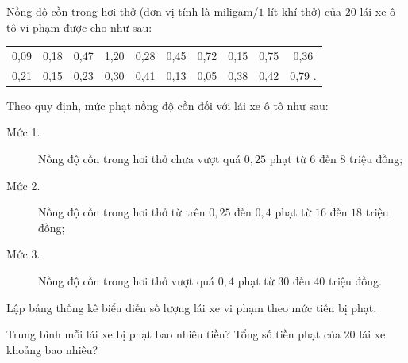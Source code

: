 \begin{ex}%
	Nồng độ cồn trong hơi thở (đơn vị tính là miligam/$1$ lít khí thở) của $20$ lái xe  ô tô vi phạm được cho như sau:
	\begin{center}
		\begin{tabular}{*{10}{c}}
			 0{,}09&0{,}18&0{,}47&1{,}20&0{,}28&0{,}45&0{,}72&0{,}15&0{,}75&0{,}36 \\
			 0{,}21&0{,}15&0{,}23&0{,}30&0{,}41&0{,}13&0{,}05&0{,}38&0{,}42&0{,}79 . \\
		\end{tabular}
	\end{center}
	 Theo quy định, mức phạt nồng độ cồn đối với lái xe ô tô như sau:
	\begin{description}
		\item[Mức  1.] Nồng độ cồn trong hơi thở chưa vượt quá $0{,}25$ phạt từ $6$ đến $8$ triệu đồng;
		\item[Mức 2.] Nồng độ cồn trong hơi thở từ trên $0{,}25$ đến $0{,}4$ phạt từ  $16$ đến $18$ triệu đồng;
		\item[Mức 3.] Nồng độ cồn trong hơi thở vượt quá $0{,}4$ phạt từ $30$  đến $40$ triệu đồng.
	\end{description}
	\begin{listEX}
		\item Lập bảng thống kê biểu diễn số lượng lái xe vi phạm  theo mức tiền bị phạt.
		\item Trung bình mỗi lái xe bị phạt bao nhiêu tiền? Tổng số tiền phạt của $20$ lái xe khoảng  bao nhiêu?
	\end{listEX}
\end{ex}


